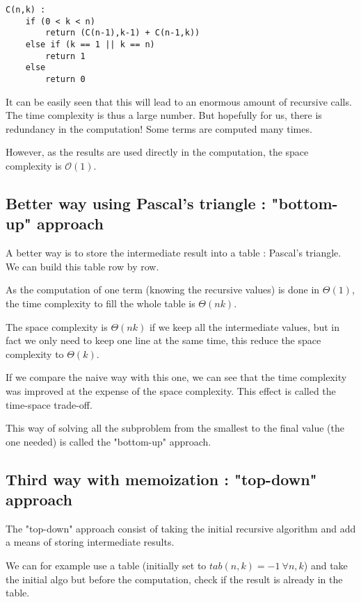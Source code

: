 \begin{lstlisting}[label={list:c4:naive},caption=Pseudo-code of the naive algorithm for the combinatorial]
C(n,k) :
    if (0 < k < n)
        return (C(n-1),k-1) + C(n-1,k))
    else if (k == 1 || k == n)
        return 1
    else
        return 0
\end{lstlisting}

It can be easily seen that this will lead to an enormous amount of recursive calls. The time complexity is thus a large number. But hopefully for us, there is redundancy in the computation! Some terms are computed many times. 

However, as the results are used directly in the computation, the space complexity is $\mathcal{O}(1)$.

\subsection{Better way using Pascal's triangle : "bottom-up" approach}

A better way is to store the intermediate result into a table : Pascal's triangle. We can build this table row by row.

As the computation of one term (knowing the recursive values) is done in $\Theta (1)$, the time complexity to fill the whole table is $\Theta (nk)$.

The space complexity is $\Theta (nk)$ if we keep all the intermediate values, but in fact we only need to keep one line at the same time, this reduce the space complexity to $\Theta (k)$.

If we compare the naive way with this one, we can see that the time complexity was improved at the expense of the space complexity. This effect is called the time-space trade-off.

This way of solving all the subproblem from the smallest to the final value (the one needed) is called the "bottom-up" approach.

\subsection{Third way with memoization : "top-down" approach} 

The "top-down" approach consist of taking the initial recursive algorithm and add a means of storing intermediate results.

We can for example use a table (initially set to $tab(n,k) = -1 \ \forall n,k$) and take the initial algo but before the computation, check if the result is already in the table. 

